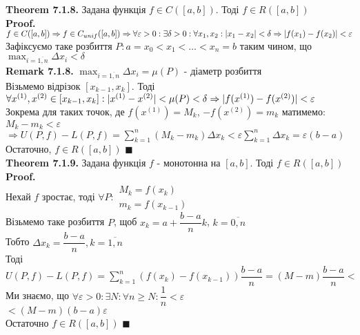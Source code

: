 \documentclass[a4paper, 14pt]{extarticle}
\def\huge{\displaystyle}
\def\bigline{\vspace{5mm}\\}
\def\rm#1{\textbf{Remark {#1}}}
\def\th#1{\textbf{Theorem {#1}}}
\def\proof{\textbf{Proof.}\\}
\def\bigline{\vspace{5mm}\\}
\def\qed{$\blacksquare$}
\begin{document}
\th{7.1.8.} Задана функція $f \in C([a,b])$. Тоді $f \in R([a,b])$\\
\proof
$f \in C([a,b]) \Rightarrow f \in C_{unif}([a,b]) \Rightarrow \\ \forall \varepsilon > 0: \exists \delta > 0: \forall x_1,x_2: |x_1 - x_2| < \delta \Rightarrow |f(x_1)-f(x_2)| < \varepsilon$\\
Зафіксуємо таке розбиття $P: a = x_0 < x_1 < \dots < x_n = b$ таким чином, що $\huge\max_{i = \overline{1,n}} \Delta x_i < \delta$
\bigline
\rm{7.1.8.} $\huge\max_{i = \overline{1,n}} \Delta x_i = \mu(P)$ - діаметр розбиття
\bigline
Візьмемо відрізок $[x_{k-1},x_k]$. Тоді $\forall x^{(1)}, x^{(2)} \in [x_{k-1},x_k]: \\ |x^{(1)} - x^{(2)}| < \mu(P) < \delta \Rightarrow |f(x^{(1)}) - f(x^{(2)})| < \varepsilon$\\
Зокрема для таких точок, де $f(x^{(1)}) = M_k$, $- f(x^{(2)}) = m_k$ матимемо:\\
$M_k - m_k < \varepsilon$\\
$\Rightarrow U(P,f) - L(P,f) = \huge\sum_{k=1}^n (M_k-m_k) \Delta x_k < \varepsilon \sum_{k=1}^n \Delta x_k = \varepsilon(b-a)$\\
Остаточно, $f \in R([a,b])$ \qed
\bigline
\th{7.1.9.} Задана функція $f$ - монотонна на $[a,b]$. Тоді $f \in R([a,b])$\\
\proof
Нехай $f$ зростає, тоді $\forall P: \begin{gathered} M_k = f(x_k) \\ m_k = f(x_{k-1}) \end{gathered}$\\
Візьмемо таке розбиття $P$, щоб $x_k = a + \dfrac{b-a}{n}k$, $k = \overline{0,n}$\\
Тобто $\Delta x_k = \dfrac{b-a}{n}, k = \overline{1,n}$\\
Тоді $U(P,f) - L(P,f) = \huge\sum_{k=1}^n (f(x_k) - f(x_{k-1})) \dfrac{b-a}{n} = (M-m) \dfrac{b-a}{n} <$\\
Ми знаємо, що $\forall \varepsilon > 0: \exists N: \forall n \geq N: \dfrac{1}{n} < \varepsilon$\\
$< (M-m)(b-a)\varepsilon$\\
Остаточно $f \in R([a,b])$ \qed
\bigline
\end{document}
